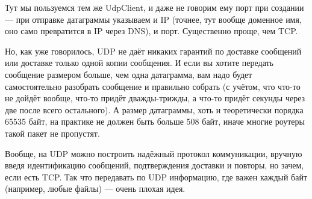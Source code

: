 \documentclass[a5paper]{article}
\begin{document}
Тут мы пользуемся тем же UdpClient, и даже не говорим ему порт при создании --- при отправке датаграммы указываем и IP (точнее, тут вообще доменное имя, оно само превратится в IP через DNS), и порт. Существенно проще, чем TCP.

Но, как уже говорилось, UDP не даёт никаких гарантий по доставке сообщений или доставке только одной копии сообщения. И если вы хотите передать сообщение размером больше, чем одна датаграмма, вам надо будет самостоятельно разобрать сообщение и правильно собрать (с учётом, что что-то не дойдёт вообще, что-то придёт дважды-трижды, а что-то придёт секунды через две после всего остального). А размер датаграммы, хоть и теоретически порядка 65535 байт, на практике не должен быть больше 508 байт, иначе многие роутеры такой пакет не пропустят. 

Вообще, на UDP можно построить надёжный протокол коммуникации, вручную введя идентификацию сообщений, подтверждения доставки и повторы, но зачем, если есть TCP. Так что передавать по UDP информацию, где важен каждый байт (например, любые файлы) --- очень плохая идея.
\end{document}
